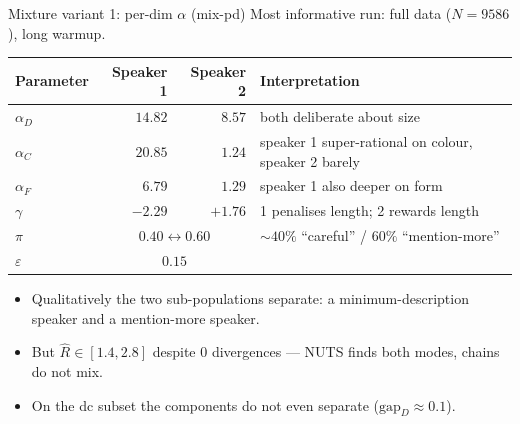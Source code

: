 \documentclass[10pt,aspectratio=169]{beamer}
\begin{document}
\begin{frame}{Mixture variant 1: per-dim $\alpha$ (mix-pd)}
\small
Most informative run: full data ($N = 9586$), long warmup.

\vspace{0.4em}
\begin{center}\footnotesize
\begin{tabular}{lrr|l}
\toprule
Parameter & Speaker 1 & Speaker 2 & Interpretation \\
\midrule
$\alpha_D$ & $14.82$ & $8.57$  & both deliberate about size \\
$\alpha_C$ & $20.85$ & $1.24$  & speaker 1 super-rational on colour, speaker 2 barely \\
$\alpha_F$ & $6.79$  & $1.29$  & speaker 1 also deeper on form \\
$\gamma$   & $-2.29$ & $+1.76$ & 1 penalises length; 2 rewards length \\
$\pi$      & \multicolumn{2}{c|}{$0.40 \leftrightarrow 0.60$} & $\sim\!40\%$ ``careful'' / $60\%$ ``mention-more'' \\
$\varepsilon$ & \multicolumn{2}{c|}{$0.15$} & \\
\bottomrule
\end{tabular}
\end{center}

\vspace{0.5em}
\begin{itemize}\itemsep0.1em
  \item Qualitatively the two sub-populations separate: a minimum-description speaker and a mention-more speaker.
  \item But $\hat R \in [1.4, 2.8]$ despite $0$ divergences --- NUTS finds both modes, chains do not mix.
  \item On the dc subset the components do not even separate ($\mathrm{gap}_D \approx 0.1$).
\end{itemize}
\end{frame}
\end{document}
